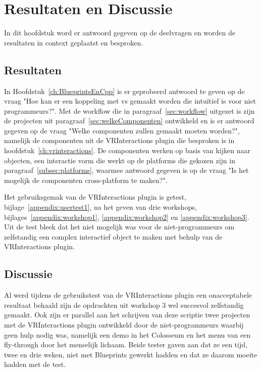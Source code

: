 \chapter{Resultaten en Discussie}
\label{ch:resultatenEnDiscussie}

In dit hoofdstuk word er antwoord gegeven op de deelvragen en worden de resultaten in context geplaatst en besproken.

\section{Resultaten}
In Hoofdstuk~\ref{ch:BlueprintsEnCpp} is er geprobeerd antwoord te geven op de vraag "Hoe kan er een koppeling met \gls{vs} gemaakt worden die intuïtief is voor niet programmeurs?". Met de workflow die in paragraaf~\ref{sec:workflow} uitgezet is zijn de projecten uit paragraaf~\ref{sec:welkeComponenten} ontwikkeld en is er antwoord gegeven op de vraag "Welke componenten zullen gemaakt moeten worden?", 
namelijk de componenten uit de VRInteractions plugin die besproken is in hoofdstuk~\ref{ch:vrinteractions}. De componenten werken op basis van kijken naar objecten, een interactie vorm die werkt op de platforms die gekozen zijn in paragraaf~\ref{subsec:platforms}, waarmee antwoord gegeven is op de vraag "Is het mogelijk de componenten cross-platform te maken?".

Het gebruiksgemak van de VRInteractions plugin is getest, bijlage~\ref{appendix:usertest1}, na het geven van drie workshops, bijlages~\ref{appendix:workshop1}, \ref{appendix:workshop2} en \ref{appendix:workshop3}. Uit de test bleek dat het niet mogelijk was voor de niet-programmeurs om zelfstandig een complex interactief object te maken met behulp van de VRInteractions plugin.

\section{Discussie}
Al werd tijdens de gebruikstest van de VRInteractions plugin een onacceptabele resultaat behaald zijn de opdrachten uit workshop 3 wel succesvol zelfstandig gemaakt. Ook zijn er parallel aan het schrijven van deze scriptie twee projecten met de VRInteractions plugin ontwikkeld door de niet-programmeurs waarbij geen hulp nodig was, namelijk een demo in het Colosseum en het menu van een fly-through door het menselijk lichaam. Beide tester gaven aan dat ze een tijd, twee en drie weken, niet met Blueprints gewerkt hadden en dat ze daarom moeite hadden met de test. 


